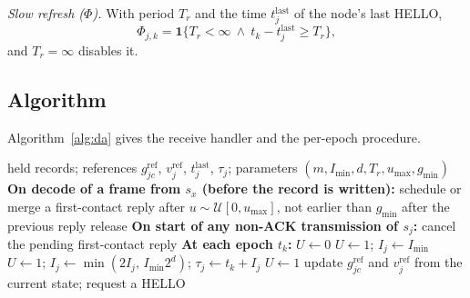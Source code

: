 \emph{Slow refresh ($\Phi$).} With period $T_r$ and the time $t^{\mathrm{last}}_j$ of the node's last HELLO,
\begin{equation}
\Phi_{j,k}=\mathbf{1}\{T_r<\infty\ \wedge\ t_k-t^{\mathrm{last}}_j\ge T_r\},
\label{eq:refresh}
\end{equation}
and $T_r=\infty$ disables it.

\subsection{Algorithm}
\label{sec:algo}
Algorithm~\ref{alg:da} gives the receive handler and the per-epoch procedure.

\begin{algorithm}[t]
\caption{DA-HELLO at node $s_j$}
\label{alg:da}
\begin{algorithmic}[1]
\Require held records; references $g^{\mathrm{ref}}_{jc}$, $v^{\mathrm{ref}}_j$, $t^{\mathrm{last}}_j$, $\tau_j$; parameters $(m,I_{\min},d,T_r,u_{\max},g_{\min})$
\Statex \textbf{On decode of a frame from $s_x$ (before the record is written):}
  \State schedule or merge a first-contact reply after $u\sim\mathcal{U}[0,u_{\max}]$, not earlier than $g_{\min}$ after the previous reply release
\EndIf
\Statex \textbf{On start of any non-ACK transmission of $s_j$:}
\State cancel the pending first-contact reply
\Statex \textbf{At each epoch $t_k$:}
\State $U\gets 0$
  \State $U\gets 1$; $I_j\gets I_{\min}$ 
  \State $U\gets 1$; $I_j\gets\min(2I_j,\,I_{\min}2^{d})$; $\tau_j\gets t_k+I_j$ 
  \State $U\gets 1$ 
\EndIf
{}
  \State update $g^{\mathrm{ref}}_{jc}$ and $v^{\mathrm{ref}}_j$ from the current state; request a HELLO
\EndIf
\end{algorithmic}
\end{algorithm}

